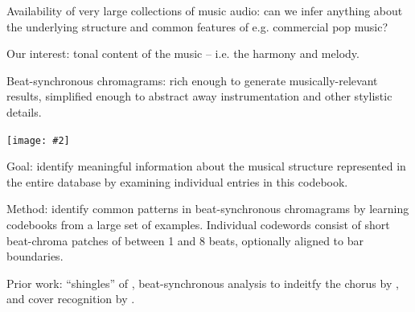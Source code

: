 \documentclass[landscape,a0b,final]{a0poster}
\newenvironment{poster}{
  \begin{center}
  \begin{minipage}[c]{0.98\textwidth}
}{
  \end{minipage} 
  \end{center}
}
\newenvironment{pcolumn}[1]{
  \begin{minipage}{#1\textwidth}
  \begin{center}
}{
  \end{center}
  \end{minipage}
}
\newcommand{\pbox}[4]{
\psshadowbox[#3]{
\begin{minipage}[t][#2][t]{#1}
#4
\end{minipage}
}}
\newcommand{\myfig}[3][0]{
\begin{center}
  \vspace{1.5cm}
  \texttt{[image: \#2]}
  \nobreak\medskip
\end{center}}
\begin{document}
\begin{poster}
\begin{center}
\begin{pcolumn}{0.98}
{}
\end{pcolumn}
\end{center}

\vspace*{0.5cm}


\begin{multicols}{3}


\begin{center}
  \pbox{0.8\columnwidth}{}{linewidth=2mm,framearc=0.1,linecolor=lightred,fillstyle=gradient,gradangle=0,gradbegin=white,gradend=whitepink,gradmidpoint=1.0,framesep=1em}{
    \begin{center}
      \large Introduction
    \end{center}}
\end{center}

\vspace{1.0cm}

\begin{list}{}{\leftmargin=2em =1em}
\item Availability of very large collections of music audio:
can we infer anything about the underlying structure and common
features of e.g. commercial pop music?
\item Our interest: tonal content of the music -- i.e. the
harmony and melody.
\item Beat-synchronous chromagrams: rich enough
to generate musically-relevant results, simplified enough to
abstract away instrumentation and other stylistic details.
\end{list}

\myfig[0]{code_axis.ps}{.2}

%
\begin{list}{}{\leftmargin=2em =1em}
\item Goal: identify meaningful information
about the musical structure represented in the entire database by
examining individual entries in this codebook.
\item Method: identify common patterns in beat-synchronous
chromagrams by learning codebooks from a large set of examples.
Individual codewords consist of short beat-chroma patches of
between 1 and 8 beats, optionally aligned to bar boundaries.
\item Prior work: ``shingles'' of \cite{Casey2007}, 
beat-synchronous analysis to indeitfy the chorus by \cite{Bartsch2001},
and cover recognition by \cite{Ellis2007a}.
\end{list}


\end{multicols}
\end{poster}
\end{document}
